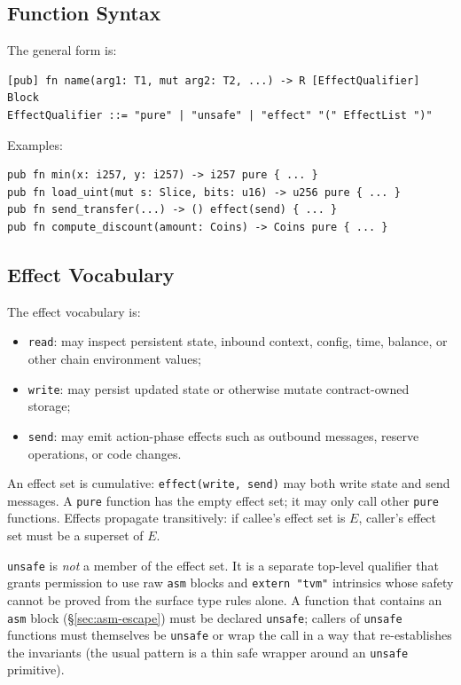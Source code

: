 \documentclass[12pt,oneside]{article}
\begin{document}
\subsection{Function Syntax}
The general form is:

\begin{verbatim}
[pub] fn name(arg1: T1, mut arg2: T2, ...) -> R [EffectQualifier] Block
EffectQualifier ::= "pure" | "unsafe" | "effect" "(" EffectList ")"
\end{verbatim}

Examples:

\begin{verbatim}
pub fn min(x: i257, y: i257) -> i257 pure { ... }
pub fn load_uint(mut s: Slice, bits: u16) -> u256 pure { ... }
pub fn send_transfer(...) -> () effect(send) { ... }
pub fn compute_discount(amount: Coins) -> Coins pure { ... }
\end{verbatim}

\subsection{Effect Vocabulary}
\label{sec:effect-vocab}
The effect vocabulary is:

\begin{itemize}
\item \verb|read|: may inspect persistent state, inbound context,
config, time, balance, or other chain environment values;
\item \verb|write|: may persist updated state or otherwise mutate
contract-owned storage;
\item \verb|send|: may emit action-phase effects such as outbound
messages, reserve operations, or code changes.
\end{itemize}

An effect set is cumulative: \verb|effect(write, send)| may both write
state and send messages. A \verb|pure| function has the empty effect
set; it may only call other \verb|pure| functions. Effects propagate
transitively: if callee's effect set is $E$, caller's effect set must
be a superset of $E$.

\verb|unsafe| is \emph{not} a member of the effect set. It is a
separate top-level qualifier that grants permission to use raw
\verb|asm| blocks and \verb|extern "tvm"| intrinsics whose safety
cannot be proved from the surface type rules alone. A function that
contains an \verb|asm| block (\S\ref{sec:asm-escape}) must be declared
\verb|unsafe|; callers of \verb|unsafe| functions must themselves be
\verb|unsafe| or wrap the call in a way that re-establishes the
invariants (the usual pattern is a thin safe wrapper around an
\verb|unsafe| primitive).
\end{document}
